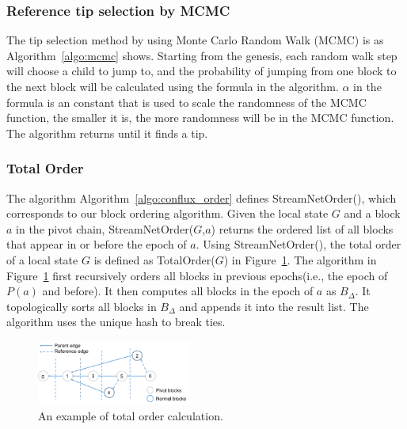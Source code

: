 

\subsubsection{Reference tip selection by MCMC} 

The tip selection method by using Monte Carlo Random Walk (MCMC) is as Algorithm~\ref{algo:mcmc} shows.
Starting from the genesis, each random walk step will choose a child to jump to,
and the probability of jumping from one block to the next block will be calculated using the formula in the algorithm.
$\alpha$ in the formula is an constant that is used to scale the randomness of the MCMC function, the smaller it is, the more randomness will be in the MCMC function.
The algorithm returns until it finds a tip.

\subsubsection{Total Order} 
The algorithm Algorithm~\ref{algo:conflux_order} defines StreamNetOrder(), 
which corresponds to our block ordering algorithm. 
Given the local state $G$ and a block $a$ in the pivot chain, 
StreamNetOrder($G$,$a$) returns the ordered list of all blocks that appear in or before the epoch of $a$. 
Using StreamNetOrder(), the total order of a local state $G$ is defined as TotalOrder($G$) in Figure~\ref{total_order}. 
The algorithm in Figure~\ref{total_order}  first recursively orders all blocks in previous epochs(i.e., the epoch of $P(a)$ and before). 
It then computes all blocks in the epoch of $a$ as $B_\Delta$. 
It topologically sorts all blocks in $B_\Delta$ and appends it into the result list. 
The algorithm uses the unique hash to break ties. 



\begin{figure}[!ht]
\begin{center}
\includegraphics[width=0.45\textwidth]{figures/total_order.pdf}
    \caption{
        An example of total order calculation.
     }
\label{total_order}
\end{center}
\end{figure}

